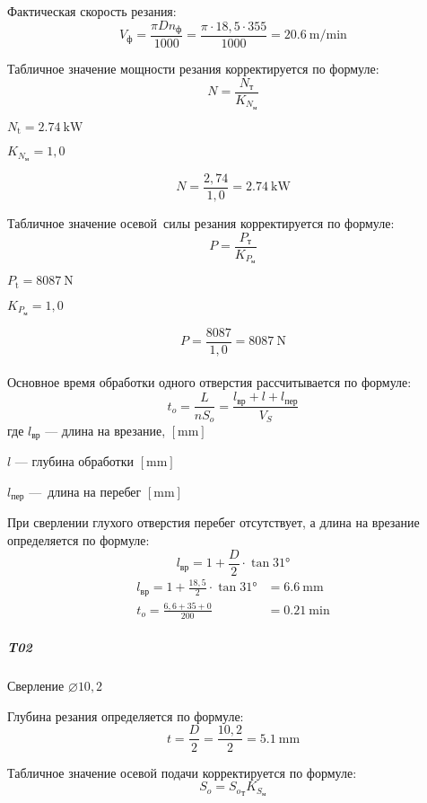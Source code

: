 \documentclass[14pt,russian,a4paper]{extreport}
\begin{document}
Фактическая скорость резания:
$$ V_\text{ф} = \frac{\pi D n_\text{ф}}{1000} = \frac{\pi \cdot 18,5 \cdot 355}{1000} = \SI{20,6}{\meter\per\minute} $$

Табличное значение мощности резания корректируется по формуле:
$$ N = \frac{N_\text{т}}{K_{N_\text{м}}} $$

$ N_\text{t} = \SI{2,74}{\kilo\watt} $ \cite[карта 46]{guzeev:rr} \par
$ K_{N_\text{м}} = 1,0 $ \cite[карта 53]{guzeev:rr}

$$ N = \frac{2,74}{1,0} = \SI{2,74}{\kilo\watt} $$

Табличное значение осевой силы резания корректируется по формуле:
$$ P = \frac{P_\text{т}}{K_{P_\text{м}}} $$

$ P_\text{t} = \SI{8087}{\newton} $ \cite[карта 46]{guzeev:rr} \par
$ K_{P_\text{м}} = 1,0 $ \cite[карта 53]{guzeev:rr}

$$ P = \frac{8087}{1,0} = \SI{8087}{\newton} $$ \\

Основное время обработки одного отверстия рассчитывается по формуле:
\begin{equation*}
  t_o = \frac{L}{n S_o} = \frac{l_\text{вр} + l + l_\text{пер}}{V_S}
\end{equation*}
где $l_\text{вр}$ --- длина на врезание, $[\si{\milli\meter}]$ \par
$l$ --- глубина обработки $[\si{\milli\meter}]$ \par
$l_\text{пер}$ --- длина на перебег $[\si{\milli\meter}]$

При сверлении глухого отверстия перебег отсутствует, а длина на врезание определяется по формуле:
\begin{equation*}
  l_\text{вр} = 1 + \frac{D}{2} \cdot \tan{\ang{31}}
\end{equation*}
\begin{align*}
    l_\text{вр} = 1 + \frac{18,5}{2} \cdot \tan{\ang{31}} &= \SI{6,6}{\milli\meter} \\
    t_o = \frac{6,6 + 35 + 0}{200} &= \SI{0,21}{\minute}
\end{align*}


\subparagraph{T02} Сверление $\diameter 10,2$ \

Глубина резания определяется по формуле:
$$ t = \frac{D}{2} = \frac{10,2}{2} = \SI{5,1}{\milli\meter} $$

Табличное значение осевой подачи корректируется по формуле:
$$ S_o = {S_o}_\text{т} K_{S_\text{м}} $$
\end{document}
